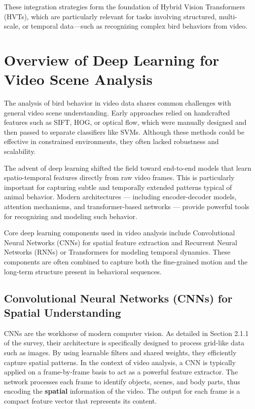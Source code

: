 These integration strategies form the foundation of Hybrid Vision Transformers (HVTs), which are particularly relevant for tasks involving structured, multi-scale, or temporal data—such as recognizing complex bird behaviors from video.


\section{Overview of Deep Learning for Video Scene Analysis}

The analysis of bird behavior in video data shares common challenges with general video scene understanding. Early approaches relied on handcrafted features such as SIFT, HOG, or optical flow, which were manually designed and then passed to separate classifiers like SVMs. Although these methods could be effective in constrained environments, they often lacked robustness and scalability.

The advent of deep learning shifted the field toward end-to-end models that learn spatio-temporal features directly from raw video frames. This is particularly important for capturing subtle and temporally extended patterns typical of animal behavior. Modern architectures — including encoder-decoder models, attention mechanisms, and transformer-based networks — provide powerful tools for recognizing and modeling such behavior.

Core deep learning components used in video analysis include Convolutional Neural Networks (CNNs) for spatial feature extraction and Recurrent Neural Networks (RNNs) or Transformers for modeling temporal dynamics. These components are often combined to capture both the fine-grained motion and the long-term structure present in behavioral sequences.

\subsection{Convolutional Neural Networks (CNNs) for Spatial Understanding}
CNNs are the workhorse of modern computer vision. As detailed in Section 2.1.1 of the survey, their architecture is specifically designed to process grid-like data such as images. By using learnable filters and shared weights, they efficiently capture spatial patterns. In the context of video analysis, a CNN is typically applied on a frame-by-frame basis to act as a powerful feature extractor. The network processes each frame to identify objects, scenes, and body parts, thus encoding the \textbf{spatial} information of the video. The output for each frame is a compact feature vector that represents its content.

